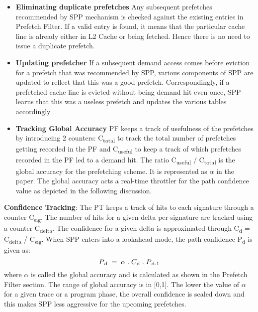 \documentclass{sig-alternate}
\begin{document}
\begin{itemize}
    \item \textbf{Eliminating duplicate prefetches}\newline 
    Any subsequent prefetches recommended by SPP mechanism is checked against the existing entries in Prefetch Filter. 
If a valid entry is found, it means that the particular cache line is already either in L2 Cache or being fetched. 
Hence there is no need to issue a duplicate prefetch.
    
    \item \textbf{Updating prefetcher}\newline
    If a subsequent demand access comes before eviction for a prefetch that was recommended by SPP, various components of SPP are updated to reflect that this was a good prefetch. 
Correspondingly, if a prefetched cache line is evicted without being demand hit even once, SPP learns that this was a useless prefetch and updates the various tables accordingly
    
    \item \textbf{Tracking Global Accuracy}\newline
    PF keeps a track of usefulness of the prefetches by introducing 2 counters: C\textsubscript{total} to track the total number of prefetches getting recorded in the PF and C\textsubscript{useful} to keep a track of which prefetches recorded in the PF led to a demand hit. 
The ratio C\textsubscript{useful} / C\textsubscript{total} is the global accuracy for the prefetching scheme. 
It is represented as $\alpha$ in the paper. 
The global accuracy acts a real-time throttler for the path confidence value as depicted in the following discussion.
\end{itemize}
\textbf{Confidence Tracking}: The PT keeps a track of hits to each signature through a counter C\textsubscript{sig}. 
The number of hits for a given delta per signature are tracked using a counter C\textsubscript{delta}. 
The confidence for a given delta is approximated through C\textsubscript{d} = C\textsubscript{delta} / C\textsubscript{sig}. 
When SPP enters into a lookahead mode, the path confidence P\textsubscript{d} is given as:
$$P\textsubscript{d} \;=\; \alpha  \;.\;  C\textsubscript{d}  \;.\;  P\textsubscript{d-1}$$ where $\alpha$ is called the global accuracy and is calculated as shown in the Prefetch Filter section. 
The range of global accuracy is in [0,1]. 
The lower the value of $\alpha$ for a given trace or a program phase, the overall confidence is scaled down and this makes SPP less aggressive for the upcoming prefetches.
\end{document}
